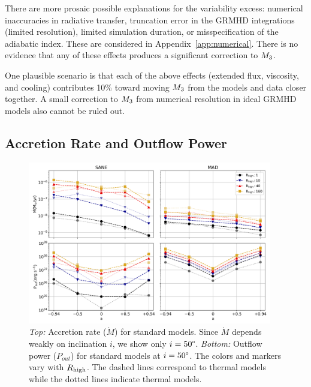 There are more prosaic possible explanations for the variability excess: numerical inaccuracies in radiative transfer, truncation error in the GRMHD integrations (limited resolution), limited simulation duration, or misspecification of the adiabatic index.  These are considered in Appendix~\ref{app:numerical}.  There is no evidence that any of these effects produces a significant correction to $M_{3}$.

One plausible scenario is that each of the above effects (extended flux, viscosity, and cooling) contributes 10\% toward moving $M_{3}$ from the models and data closer together. A small correction to $M_{3}$ from numerical resolution in ideal GRMHD models also cannot be ruled out.



\subsection{Accretion Rate and Outflow Power}



\begin{figure}
  \centering
  \includegraphics[width=0.95\textwidth]{figures/bhac_kharma_average_mdot_pout.png}
  \caption{{\it Top:} Accretion rate ($\dot{M}$) for standard models. Since $\dot{M}$ depends weakly on inclination $i$, we show only $i=50\degree$. {\it Bottom:} Outflow power ($P_{out}$) for standard models at $i = 50\degree$. The colors and markers vary with $R_\mathrm{high}$. The dashed lines correspond to \kharma thermal models while the dotted lines indicate \bhac thermal models.}
  \label{fig:accretion_outflow_power_illinois_thermal}
\end{figure}


